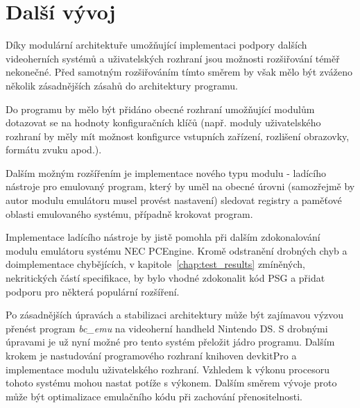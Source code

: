 \section{Další vývoj}

Díky modulární architektuře umožňující implementaci podpory dalších
videoherních systémů a uživatelských rozhraní jsou možnosti rozšiřování téměř
nekonečné. Před samotným rozšiřováním tímto směrem by však mělo být zváženo
několik zásadnějších zásahů do architektury programu.

Do programu by mělo být přidáno obecné rozhraní umožňující modulům dotazovat se
na hodnoty konfiguračních klíčů (např. moduly uživatelského rozhraní by měly
mít možnost konfigurce vstupních zařízení, rozlišení obrazovky, formátu zvuku
apod.).

Dalším možným rozšířením je implementace nového typu modulu - ladícího
nástroje pro emulovaný program, který by uměl na obecné úrovni (samozřejmě by
autor modulu emulátoru musel provést nastavení) sledovat registry a paměťové
oblasti emulovaného systému, případně krokovat program.

Implementace ladícího nástroje by jistě pomohla při dalším zdokonalování modulu
emulátoru systému NEC PCEngine. Kromě odstranění drobných chyb a doimplementace
chybějících, v kapitole~\ref{chap:test_results} zmíněných, nekritických částí
specifikace, by bylo vhodné zdokonalit kód PSG a přidat podporu pro některá
populární rozšíření.

Po zásadnějších úpravách a stabilizaci architektury může být zajímavou výzvou
přenést program {\em bc\_emu} na videoherní handheld Nintendo DS. S drobnými
úpravami je už nyní možné pro tento systém přeložit jádro programu. Dalším
krokem je nastudování programového rozhraní knihoven devkitPro a implementace
modulu uživatelského rozhraní. Vzhledem k výkonu procesoru tohoto systému mohou
nastat potíže s výkonem. Dalším směrem vývoje proto může být optimalizace
emulačního kódu při zachování přenositelnosti.
